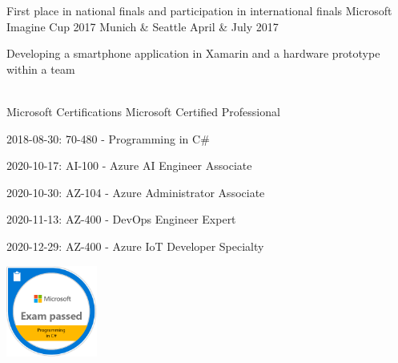 




\begin{cvhonors}

\cventry
{First place in national finals and participation in international finals} %
{Microsoft Imagine Cup 2017} %
{Munich \& Seattle} %
{April \& July 2017} %
{ %
\begin{cvitems}
\item {Developing a smartphone application in Xamarin and a hardware prototype within a team}
\end{cvitems}
}
\\
\cventry
{Microsoft Certifications} %
{Microsoft Certified Professional} %
{} %
{} %
{ %
\begin{cvitems}
    \item {2018-08-30: 70-480 - Programming in C\#}
    \item {2020-10-17: AI-100 - Azure AI Engineer Associate}
    \item {2020-10-30: AZ-104 - Azure Administrator Associate}
    \item {2020-11-13: AZ-400 - DevOps Engineer Expert}
    \item {2020-12-29: AZ-400 - Azure IoT Developer Specialty}

    \item[]{      
          \includegraphics[width=3cm, height=3cm]{Badge70-480.png}
}
\end{cvitems}}
\end{cvhonors}
